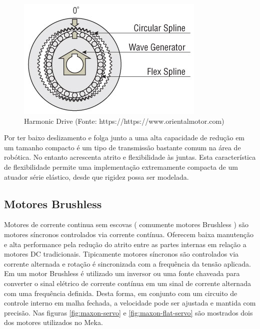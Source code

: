 \begin{figure}[H]
    \centering
    \includegraphics[width=0.6\linewidth]{tex/figs/harmonic-gear-structure.jpg}
    \caption{Harmonic Drive (Fonte: https://https://www.orientalmotor.com)}
    \label{fig:harmonic_drive}
\end{figure}

Por ter baixo deslizamento e folga junto a uma alta capacidade de redução em um tamanho compacto é um tipo de transmissão bastante comum na área de robótica. No entanto acrescenta atrito e flexibilidade às juntas. Esta característica de flexibilidade permite uma implementação extremamente compacta de um atuador série elástico, desde que rigidez possa ser modelada.





\subsection{Motores Brushless}
Motores de corrente continua sem escovas ( comumente motores Brushless ) são motores síncronos controlados via corrente contínua. Oferecem baixa manutenção e alta performance pela redução do atrito entre as partes internas em relação a motores DC tradicionais. Tipicamente motores síncronos são controlados via corrente alternada e rotação é sincronizada com a frequência da tensão aplicada. Em um motor Brushless é utilizado um inversor ou uma fonte chaveada para converter o sinal elétrico de corrente contínua em um sinal de corrente alternada com uma frequência definida. Desta forma, em conjunto com um circuito de controle interno em malha fechada, a velocidade pode ser ajustada e mantida com precisão. \cite{nobody} Nas figuras \ref{fig:maxon-servo} e \ref{fig:maxon-flat-servo} são mostrados dois dos motores utilizados no Meka.

